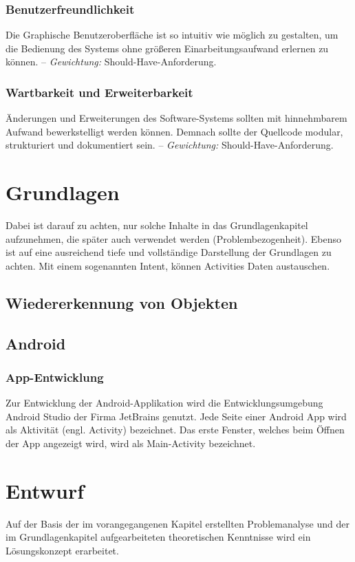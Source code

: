 \documentclass[oneside]{ausarbeitung}
\begin{document}
\subsection{Benutzerfreundlichkeit}
Die Graphische Benutzeroberfläche ist so intuitiv wie möglich zu gestalten, um die Bedienung des Systems ohne größeren Einarbeitungsaufwand erlernen zu können. -- \textit{Gewichtung:} Should-Have-Anforderung.

\subsection{Wartbarkeit und Erweiterbarkeit}
Änderungen und Erweiterungen des Software-Systems sollten mit hinnehmbarem Aufwand bewerkstelligt werden können. Demnach sollte der Quellcode modular, strukturiert und dokumentiert sein. -- \textit{Gewichtung:} Should-Have-Anforderung.
\chapter{Grundlagen}
\label{cha:grundlagen}

Dabei ist darauf zu achten, nur solche Inhalte in das Grundlagenkapitel 
aufzunehmen, die später auch verwendet werden (Problembezogenheit). 
Ebenso ist auf eine ausreichend tiefe und vollständige Darstellung der 
Grundlagen zu achten. Mit einem sogenannten Intent, können Activities Daten austauschen.

\section{Wiedererkennung von Objekten}
\label{sec:basics:wiedererkennung}

\section{Android}
\label{sub:basics:android}

\subsection{App-Entwicklung}
Zur Entwicklung der Android-Applikation wird die Entwicklungsumgebung Android Studio der Firma JetBrains genutzt.
Jede Seite einer Android App wird als Aktivität (engl. Activity) bezeichnet.
Das erste Fenster, welches beim Öffnen der App angezeigt wird, wird als Main-Activity bezeichnet.
\chapter{Entwurf}
\label{cha:Entwurf}
Auf der Basis der im vorangegangenen Kapitel erstellten Problemanalyse 
und der im Grundlagenkapitel aufgearbeiteten theoretischen Kenntnisse 
wird ein Lösungskonzept erarbeitet.
\end{document}
